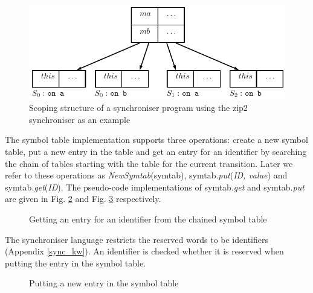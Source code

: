   \begin{figure}[h!]
  \centering
  \includegraphics{figs/chapter_02_symtab_chain.pdf}
  \caption{Scoping structure of a synchroniser program using the zip2 synchroniser as an example}
  \label{fig:symtab_chain}
  \end{figure}

The symbol table implementation supports three operations: create a new symbol table, put a new entry in the table and get an entry for an identifier by searching the chain of tables starting with the table for the current transition. Later we refer to these operations as \emph{NewSymtab}(symtab), symtab.\emph{put}(\emph{ID, value}) and symtab.\emph{get}(\emph{ID}). The pseudo-code implementations of symtab.\emph{get} and symtab.\emph{put} are given in Fig. \ref{symtab_get} and Fig. \ref{symtab_put} respectively.

\begin{figure}[h!]
\noindent{}
\caption{Getting an entry for an identifier from the chained symbol table\label{symtab_get}}
\end{figure}

The synchroniser language restricts the reserved words to be identifiers (Appendix \ref{sync_kw}). An identifier is checked whether it is reserved when putting the entry in the symbol table.

\begin{figure}[h!]
\noindent{}
\caption{Putting a new entry in the symbol table\label{symtab_put}}
\end{figure}



